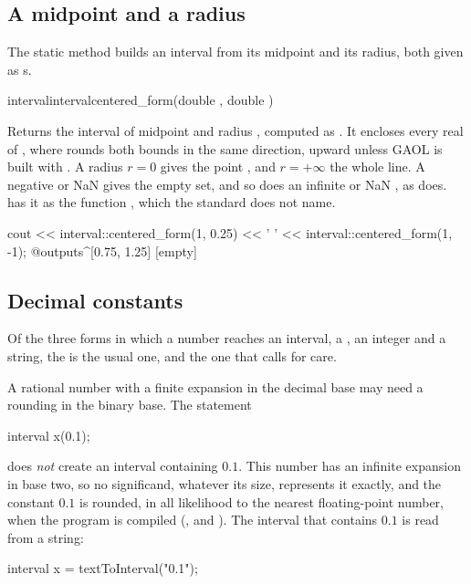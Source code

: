 \subsection{A midpoint and a radius}

The static method  builds an interval from its
midpoint and its radius, both given as s.

\begin{defstaticmethod}{interval}{interval}{centered\_form}{(double , double )}
  \begin{operation}
  \end{operation}
  Returns the interval of midpoint  and radius , computed as
  . It encloses every
  real of , where  rounds both bounds in the same direction, upward unless GAOL is built
  with . A radius $r=0$ gives the point ,
  and $r=+\infty$ the whole line. A negative or NaN  gives the empty
  set, and so does an infinite or NaN , as 
  does.\newinvfive{}  has it as the function
  , which the standard does not name.
  \begin{example}
cout << interval::centered_form(1, 0.25) << ' '
     << interval::centered_form(1, -1);
@outputs^[0.75, 1.25] [empty]~
  \end{example}
\end{defstaticmethod}

\subsection{Decimal constants}

Of the three forms in which a number reaches an interval, a , an integer and a string, the  is
the usual one, and the one that calls for care.

\begin{Rem}
A rational number with a finite expansion in the decimal base may need a
rounding in the binary base. The statement
\begin{example}
  interval x(0.1);
\end{example}
\noindent
does \emph{not} create an interval containing $0.1$. This number has an
infinite expansion in base two, so no significand, whatever its size,
represents it exactly, and the constant $0.1$ is rounded, in all likelihood
to the nearest floating-point number, when the program is compiled
(, and ). The
interval that contains $0.1$ is read from a string:
\begin{example}
interval x = textToInterval("0.1");
\end{example}
\end{Rem}

